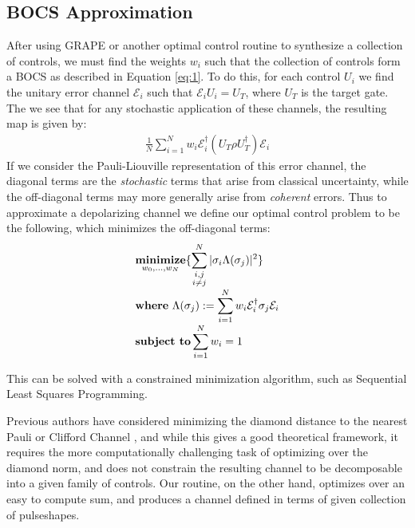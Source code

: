 \documentclass[aps,nofootinbib,pra,notitlepage,twocolumn]{revtex4-1}
\begin{document}
\subsection{BOCS Approximation}
After using GRAPE or another optimal control routine to synthesize a collection of controls, we must find the weights $w_i$ such that the collection of controls form a BOCS as described in Equation \ref{eq:1}. To do this, for each control $U_i$ we find the unitary error channel $\mathcal{E}_i$ such that $\mathcal{E}_iU_i=U_T$, where $U_T$ is the target gate. The we see that for any stochastic application of these channels, the resulting map is given by:
\begin{align}
 \frac{1}{N} \sum^N_{i=1} w_i \mathcal{E}_i^{\dagger} (U_T\rho U_T^{\dagger}) \mathcal{E}_i
\end{align} If we consider the Pauli-Liouville representation\cite{Kimmel2014} of this error channel, the diagonal terms are the \textit{stochastic} terms that arise from classical uncertainty, while the off-diagonal terms may more generally arise from \textit{coherent} errors.
Thus to approximate a depolarizing channel we define our optimal control problem to be the following, which minimizes the off-diagonal terms:
\begin{equation}\label{eq:minimization}
\setlength{\jot}{0pt}
  \begin{split}
    &\underset{w_0, ..., w_N}{\textbf{minimize}} \{\sum_{\substack{i,j \\ i\neq j}}^N|\sigma_i\Lambda(\sigma_j)|^2\}\\
    &\textbf{where}\ \Lambda(\sigma_j) := \sum^N_{i=1}w_i\mathcal{E}_i^{\dagger}\sigma_j\mathcal{E}_i\\
    &\textbf{subject to} \sum_{i=1}^Nw_i = 1
  \end{split}
\end{equation}

This can be solved with a constrained minimization algorithm, such as Sequential Least Squares Programming\cite{wright1999numerical}.

Previous authors have considered minimizing the diamond distance to the nearest Pauli or Clifford Channel \cite{Magesan2013}, and while this gives a good theoretical framework, it requires the more computationally challenging task of optimizing over the diamond norm, and does not constrain the resulting channel to be decomposable into a given family of controls. Our routine, on the other hand, optimizes over an easy to compute sum, and produces a channel defined in terms of given collection of pulseshapes.
\end{document}
